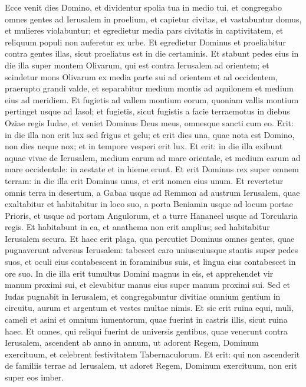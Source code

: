 \begin{biblechapter}  
\verse Ecce venit dies Domino, et dividentur spolia tua in medio tui, 
\verse et congregabo omnes gentes ad Ierusalem in proelium, et capietur civitas, et vastabuntur domus, et mulieres violabuntur; et egredietur media pars civitatis in captivitatem, et reliquum populi non auferetur ex urbe. 
\verse Et egredietur Dominus et proeliabitur contra gentes illas, sicut proeliatus est in die certaminis. 
\verse Et stabunt pedes eius in die illa super montem Olivarum, qui est contra Ierusalem ad orientem; et scindetur mons Olivarum ex media parte sui ad orientem et ad occidentem, praerupto grandi valde, et separabitur medium montis ad aquilonem et medium eius ad meridiem. 
\verse Et fugietis ad vallem montium eorum, quoniam vallis montium pertinget usque ad Iasol; et fugietis, sicut fugistis a facie terraemotus in diebus Oziae regis Iudae, et veniet Dominus Deus meus, omnesque sancti cum eo. 
\verse Erit: in die illa non erit lux sed frigus et gelu; 
\verse et erit dies una, quae nota est Domino, non dies neque nox; et in tempore vesperi erit lux. 
\verse Et erit: in die illa exibunt aquae vivae de Ierusalem, medium earum ad mare orientale, et medium earum ad mare occidentale: in aestate et in hieme erunt.  
\verse Et erit Dominus rex super omnem terram: in die illa erit Dominus unus, et erit nomen eius unum. 
\verse Et revertetur omnis terra in desertum, a Gabaa usque ad Remmon ad austrum Ierusalem, quae exaltabitur et habitabitur in loco suo, a porta Beniamin usque ad locum portae Prioris, et usque ad portam Angulorum, et a turre Hananeel usque ad Torcularia regis. 
\verse Et habitabunt in ea, et anathema non erit amplius; sed habitabitur Ierusalem secura. 
\verse Et haec erit plaga, qua percutiet Dominus omnes gentes, quae pugnaverunt adversus Ierusalem: tabescet caro uniuscuiusque stantis super pedes suos, et oculi eius contabescent in foraminibus suis, et lingua eius contabescet in ore suo. 
\verse In die illa erit tumultus Domini magnus in eis, et apprehendet vir manum proximi sui, et elevabitur manus eius super manum proximi sui. 
\verse Sed et Iudas pugnabit in Ierusalem, et congregabuntur divitiae omnium gentium in circuitu, aurum et argentum et vestes multae nimis. 
\verse Et sic erit ruina equi, muli, cameli et asini et omnium iumentorum, quae fuerint in castris illis, sicut ruina haec. 
\verse Et omnes, qui reliqui fuerint de universis gentibus, quae venerunt contra Ierusalem, ascendent ab anno in annum, ut adorent Regem, Dominum exercituum, et celebrent festivitatem Tabernaculorum. 
\verse Et erit: qui non ascenderit de familiis terrae ad Ierusalem, ut adoret Regem, Dominum exercituum, non erit super eos imber. 

\end{biblechapter}
